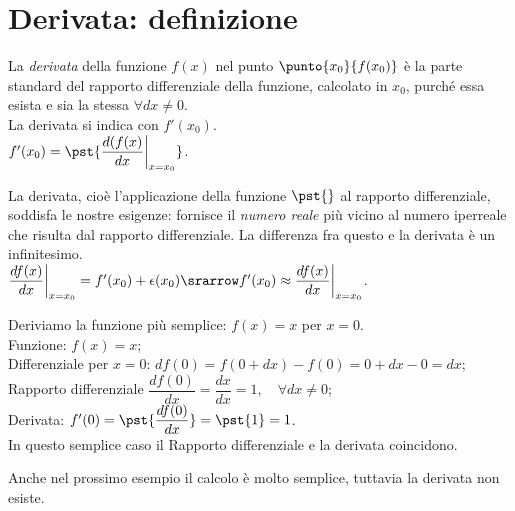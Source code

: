 \section{Derivata: definizione}
\label{sec:diff01_deriv}
\begin{definizione}
  La \emph{derivata} della funzione $f(x)$ nel punto $\punto{x_0}{f(x_0)}$
  è la parte standard del rapporto differenziale della funzione,
  calcolato in $x_0$, purché essa esista e sia la stessa $\forall dx\ne 0$.\\
  La derivata si indica con $f'(x_0)$.\\
  $f'(x_0)=\pst{\dfrac{d(f(x)}{dx}\bigg|_{x=x_0}}$.
\end{definizione}

La derivata, cioè l'applicazione della funzione $\pst{}$ al rapporto
differenziale, soddisfa le nostre esigenze: fornisce il \emph{numero reale} 
più vicino al numero iperreale che risulta dal rapporto differenziale. 
La differenza fra questo e la derivata è un infinitesimo.\\
$\dfrac{df(x)}{dx}\bigg|_{x=x_0}=f'(x_0)+\epsilon(x_0)\srarrow f'(x_0)
\approx \dfrac{df(x)}{dx}\bigg|_{x=x_0}$.

\begin{esempio}
 Deriviamo la funzione più semplice: $f(x)=x$ per $x=0$.\\
 Funzione: $f(x)=x$;\\
 Differenziale per $x=0$: $df(0)=f(0+dx)-f(0)=0+dx-0=dx$;\\
 Rapporto differenziale $\dfrac{df(0)}{dx}=\dfrac{dx}{dx}=1, \quad 
 \forall dx \ne 0$;\\
 Derivata: $f'(0)=\pst{\dfrac{df(0)}{dx}}=\pst{1}=1$.\\
 In questo semplice caso il Rapporto differenziale e la derivata coincidono. 
\end{esempio}

Anche nel prossimo esempio il calcolo è molto semplice, tuttavia la derivata 
non esiste.

